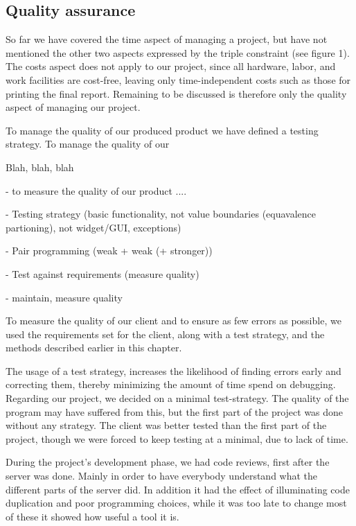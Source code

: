 \subsection{Quality assurance}

So far we have covered the time aspect of managing a project, but have not mentioned the other two aspects expressed by the triple constraint (see figure 1).
The costs aspect does not apply to our project, since all hardware, labor, and work facilities are cost-free, leaving only time-independent costs such as those for printing the final report.
Remaining to be discussed is therefore only the quality aspect of managing our project.

To manage the quality of our produced product we have defined a testing strategy. To manage the quality of our 

Blah, blah, blah

- to measure the quality of our product ....


- Testing strategy (basic functionality, not value boundaries (equavalence partioning), not widget/GUI, exceptions)

- Pair programming (weak + weak (+ stronger))

- Test against requirements (measure quality)


- maintain, measure quality






To measure the quality of our client and to ensure as few errors as possible, we used the requirements set for the client, along with a test strategy, and the methods described earlier in this chapter.

The usage of a test strategy, increases the likelihood of finding errors early and correcting them, thereby minimizing the amount of time spend on debugging.
Regarding our project, we decided on a minimal test-strategy. The quality of the program may have suffered from this, but the first part of the project was done without any strategy. The client was better tested than the first part of the project, though we were forced to keep testing at a minimal, due to lack of time.

During the project's development phase, we had code reviews, first after the server was done. Mainly in order to have everybody understand what the different parts of the server did. In addition it had the effect of illuminating code duplication and poor programming choices, while it was too late to change most of these it showed how useful a tool it is.